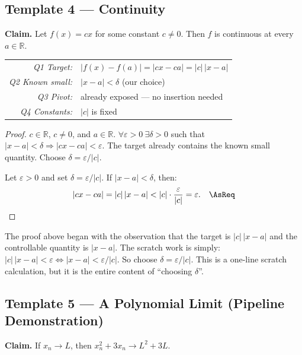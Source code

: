 \subsection{Template 4 — Continuity}

\textbf{Claim.} Let $f(x) = cx$ for some constant $c \ne 0$.
Then $f$ is continuous at every $a \in \mathbb{R}$.

\begin{center}
\renewcommand{\arraystretch}{1.3}
\begin{tabular}{r l}
\toprule
\textit{Q1 Target:} & $|f(x)-f(a)| = |cx - ca| = |c|\,|x-a|$ \\
\textit{Q2 Known small:} & $|x-a| < \delta$ (our choice) \\
\textit{Q3 Pivot:} & already exposed — no insertion needed \\
\textit{Q4 Constants:} & $|c|$ is fixed \\
\bottomrule
\end{tabular}
\end{center}

\begin{proof}
\Given $c \in \mathbb{R}$, $c \ne 0$, and $a \in \mathbb{R}$.
\Goal $\forall\varepsilon>0\ \exists\delta>0$ such that
$|x-a|<\delta \Rightarrow |cx - ca| < \varepsilon$.
\Strategy The target already contains the known small quantity.
Choose $\delta = \varepsilon/|c|$.

Let $\varepsilon > 0$ and set $\delta = \varepsilon / |c|$.
If $|x - a| < \delta$, then:
\[
  |cx - ca| = |c|\,|x-a| < |c| \cdot \frac{\varepsilon}{|c|} = \varepsilon. \quad\AsReq
\]
\end{proof}

\begin{remark*}
The proof above began with the observation that the target is
$|c|\,|x-a|$ and the controllable quantity is $|x-a|$.
The scratch work is simply:
$|c|\,|x-a| < \varepsilon \Leftrightarrow |x-a| < \varepsilon/|c|$.
So choose $\delta = \varepsilon/|c|$.
This is a one-line scratch calculation, but it is the entire content
of ``choosing $\delta$''.
\end{remark*}

\subsection{Template 5 — A Polynomial Limit (Pipeline Demonstration)}

\textbf{Claim.} If $x_n \to L$, then $x_n^2 + 3x_n \to L^2 + 3L$.

